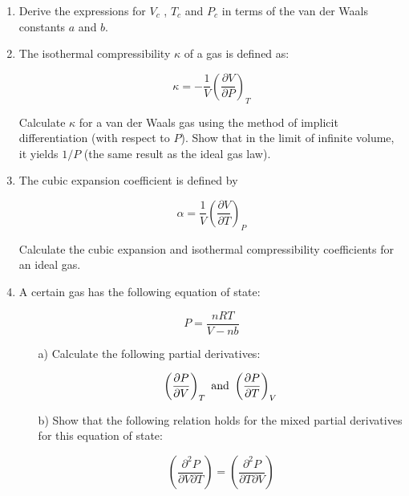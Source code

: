 \begin{enumerate}

\item Derive the expressions for $V_c$ , $T_c$ and $P_c$ in terms of the van der Waals constants $a$ and $b$.


\item The isothermal compressibility $\kappa$ of a gas is defined as:

$$\kappa = -\frac{1}{V}\left(\frac{\partial V}{\partial P}\right)_T$$

Calculate $\kappa$ for a van der Waals gas using the method of implicit differentiation (with respect to $P$). Show that in the limit of infinite volume, it yields $1/P$ (the same result as the ideal gas law).


\item The cubic expansion coefficient is defined by

$$\alpha = \frac{1}{V}\left(\frac{\partial V}{\partial T}\right)_P$$

Calculate the cubic expansion and isothermal compressibility coefficients for an ideal gas.


\item A certain gas has the following equation of state:

$$P = \frac{nRT}{V - nb}$$

\begin{itemize}

\item[a)] Calculate the following partial derivatives:

$$\left(\frac{\partial P}{\partial V}\right)_T\textnormal{ and }\left(\frac{\partial P}{\partial T}\right)_V$$

\item[b)] Show that the following relation holds for the mixed partial derivatives for this equation of state:

$$\left(\frac{\partial^2 P}{\partial V\partial T}\right) = \left(\frac{\partial^2 P}{\partial T\partial V}\right)$$

\end{itemize}



\end{enumerate}
